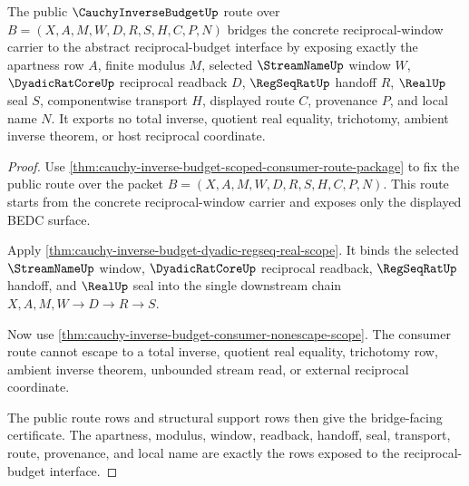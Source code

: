 \begin{theorem}
\label{thm:cauchy-inverse-budget-bridge-route}
The public $\CauchyInverseBudgetUp$ route over
$B=(X,A,M,W,D,R,S,H,C,P,N)$ bridges the concrete reciprocal-window carrier to
the abstract reciprocal-budget interface by exposing exactly the apartness row
$A$, finite modulus $M$, selected $\StreamNameUp$ window $W$,
$\DyadicRatCoreUp$ reciprocal readback $D$, $\RegSeqRatUp$ handoff $R$,
$\RealUp$ seal $S$, componentwise transport $H$, displayed route $C$,
provenance $P$, and local name $N$. It exports no total inverse, quotient real
equality, trichotomy, ambient inverse theorem, or host reciprocal coordinate.
\end{theorem}
\begin{proof}
Use \autoref{thm:cauchy-inverse-budget-scoped-consumer-route-package} to fix the
public route over the packet $B=(X,A,M,W,D,R,S,H,C,P,N)$. This route starts
from the concrete reciprocal-window carrier and exposes only the displayed BEDC
surface.

Apply \autoref{thm:cauchy-inverse-budget-dyadic-regseq-real-scope}. It binds the
selected $\StreamNameUp$ window, $\DyadicRatCoreUp$ reciprocal readback,
$\RegSeqRatUp$ handoff, and $\RealUp$ seal into the single downstream chain
$X,A,M,W \longrightarrow D \longrightarrow R \longrightarrow S$.

Now use \autoref{thm:cauchy-inverse-budget-consumer-nonescape-scope}. The
consumer route cannot escape to a total inverse, quotient real equality,
trichotomy row, ambient inverse theorem, unbounded stream read, or external
reciprocal coordinate.

The public route rows and structural support rows then give the bridge-facing
certificate. The apartness, modulus, window, readback, handoff, seal,
transport, route, provenance, and local name are exactly the rows exposed to
the reciprocal-budget interface.
\end{proof}

